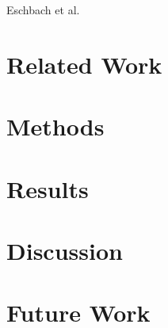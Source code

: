 \documentclass{vgtc}                          %
\begin{document}
Eschbach et al.~\cite{eschbach2005orthogonal}


\section{Related Work}

\section{Methods}

\section{Results}

\section{Discussion}

\section{Future Work}




\end{document}
